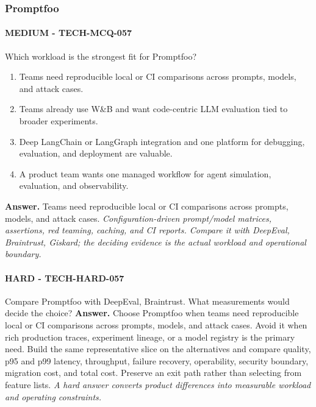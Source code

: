 \subsubsection*{Promptfoo}
\paragraph{MEDIUM - TECH-MCQ-057} Which workload is the strongest fit for Promptfoo?
\begin{enumerate}[label=\Alph*.]
\item Teams need reproducible local or CI comparisons across prompts, models, and attack cases.
\item Teams already use W\&B and want code-centric LLM evaluation tied to broader experiments.
\item Deep LangChain or LangGraph integration and one platform for debugging, evaluation, and deployment are valuable.
\item A product team wants one managed workflow for agent simulation, evaluation, and observability.
\end{enumerate}
\textbf{Answer.} Teams need reproducible local or CI comparisons across prompts, models, and attack cases.
\textit{Configuration-driven prompt/model matrices, assertions, red teaming, caching, and CI reports. Compare it with DeepEval, Braintrust, Giskard; the deciding evidence is the actual workload and operational boundary.}
\paragraph{HARD - TECH-HARD-057} Compare Promptfoo with DeepEval, Braintrust. What measurements would decide the choice?
\textbf{Answer.} Choose Promptfoo when teams need reproducible local or CI comparisons across prompts, models, and attack cases. Avoid it when rich production traces, experiment lineage, or a model registry is the primary need. Build the same representative slice on the alternatives and compare quality, p95 and p99 latency, throughput, failure recovery, operability, security boundary, migration cost, and total cost. Preserve an exit path rather than selecting from feature lists.
\textit{A hard answer converts product differences into measurable workload and operating constraints.}
